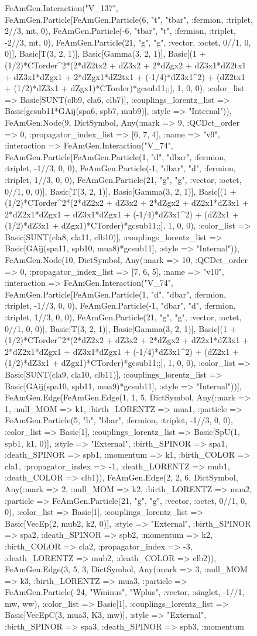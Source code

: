\documentclass{revtex4}
\begin{document}
\begin{figure}[!htb]
\begin{center}
{FeAmGen.Interaction("V_137", FeAmGen.Particle[FeAmGen.Particle(6, "t", "tbar", :fermion, :triplet, 2//3, mt, 0), FeAmGen.Particle(-6, "tbar", "t", :fermion, :triplet, -2//3, mt, 0), FeAmGen.Particle(21, "g", "g", :vector, :octet, 0//1, 0, 0)], Basic[T(3, 2, 1)], Basic[Gamma(3, 2, 1)], Basic[(1 + (1/2)*CTorder^2*(2*dZ2tx2 + dZ3x2 + 2*dZgx2 + dZ3x1*dZ2tx1 + dZ3x1*dZgx1 + 2*dZgx1*dZ2tx1 + (-1/4)*dZ3x1^2) + (dZ2tx1 + (1/2)*dZ3x1 + dZgx1)*CTorder)*gcsub11;;], 1, 0, 0), :color_list => Basic[SUNT(clb9, cla6, clb7)], :couplings_lorentz_list => Basic[gcsub11*GAij(spa6, spb7, mub9)], :style => "Internal")), FeAmGen.Node(9, Dict{Symbol, Any}(:mark => 9, :QCDct_order => 0, :propagator_index_list => [6, 7, 4], :name => "v9", :interaction => FeAmGen.Interaction("V_74", FeAmGen.Particle[FeAmGen.Particle(1, "d", "dbar", :fermion, :triplet, -1//3, 0, 0), FeAmGen.Particle(-1, "dbar", "d", :fermion, :triplet, 1//3, 0, 0), FeAmGen.Particle(21, "g", "g", :vector, :octet, 0//1, 0, 0)], Basic[T(3, 2, 1)], Basic[Gamma(3, 2, 1)], Basic[(1 + (1/2)*CTorder^2*(2*dZ2x2 + dZ3x2 + 2*dZgx2 + dZ2x1*dZ3x1 + 2*dZ2x1*dZgx1 + dZ3x1*dZgx1 + (-1/4)*dZ3x1^2) + (dZ2x1 + (1/2)*dZ3x1 + dZgx1)*CTorder)*gcsub11;;], 1, 0, 0), :color_list => Basic[SUNT(cla8, cla11, clb10)], :couplings_lorentz_list => Basic[GAij(spa11, spb10, mua8)*gcsub11], :style => "Internal")), FeAmGen.Node(10, Dict{Symbol, Any}(:mark => 10, :QCDct_order => 0, :propagator_index_list => [7, 6, 5], :name => "v10", :interaction => FeAmGen.Interaction("V_74", FeAmGen.Particle[FeAmGen.Particle(1, "d", "dbar", :fermion, :triplet, -1//3, 0, 0), FeAmGen.Particle(-1, "dbar", "d", :fermion, :triplet, 1//3, 0, 0), FeAmGen.Particle(21, "g", "g", :vector, :octet, 0//1, 0, 0)], Basic[T(3, 2, 1)], Basic[Gamma(3, 2, 1)], Basic[(1 + (1/2)*CTorder^2*(2*dZ2x2 + dZ3x2 + 2*dZgx2 + dZ2x1*dZ3x1 + 2*dZ2x1*dZgx1 + dZ3x1*dZgx1 + (-1/4)*dZ3x1^2) + (dZ2x1 + (1/2)*dZ3x1 + dZgx1)*CTorder)*gcsub11;;], 1, 0, 0), :color_list => Basic[SUNT(cla9, cla10, clb11)], :couplings_lorentz_list => Basic[GAij(spa10, spb11, mua9)*gcsub11], :style => "Internal"))], FeAmGen.Edge[FeAmGen.Edge(1, 1, 5, Dict{Symbol, Any}(:mark => 1, :null_MOM => k1, :birth_LORENTZ => mua1, :particle => FeAmGen.Particle(5, "b", "bbar", :fermion, :triplet, -1//3, 0, 0), :color_list => Basic[1], :couplings_lorentz_list => Basic[SpU(1, spb1, k1, 0)], :style => "External", :birth_SPINOR => spa1, :death_SPINOR => spb1, :momentum => k1, :birth_COLOR => cla1, :propagator_index => -1, :death_LORENTZ => mub1, :death_COLOR => clb1)), FeAmGen.Edge(2, 2, 6, Dict{Symbol, Any}(:mark => 2, :null_MOM => k2, :birth_LORENTZ => mua2, :particle => FeAmGen.Particle(21, "g", "g", :vector, :octet, 0//1, 0, 0), :color_list => Basic[1], :couplings_lorentz_list => Basic[VecEp(2, mub2, k2, 0)], :style => "External", :birth_SPINOR => spa2, :death_SPINOR => spb2, :momentum => k2, :birth_COLOR => cla2, :propagator_index => -3, :death_LORENTZ => mub2, :death_COLOR => clb2)), FeAmGen.Edge(3, 5, 3, Dict{Symbol, Any}(:mark => 3, :null_MOM => k3, :birth_LORENTZ => mua3, :particle => FeAmGen.Particle(-24, "Wminus", "Wplus", :vector, :singlet, -1//1, mw, ww), :color_list => Basic[1], :couplings_lorentz_list => Basic[VecEpC(3, mua3, K3, mw)], :style => "External", :birth_SPINOR => spa3, :death_SPINOR => spb3, :momentum }
\end{center}
\end{figure}
\end{document}
